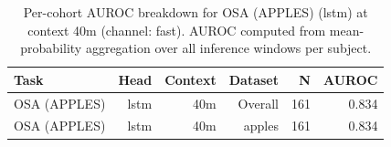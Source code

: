 \begin{table}[ht]
\centering
\caption{Per-cohort AUROC breakdown for OSA (APPLES) (lstm) at context 40m (channel: fast). AUROC computed from mean-probability aggregation over all inference windows per subject.}
\label{tab:cohort_osa_binary_apples_postqc_lstm_fast}
\begin{tabular}{lrrrrr}
\toprule
Task & Head & Context & Dataset & N & AUROC \\
\midrule
OSA (APPLES) & lstm & 40m & Overall & 161 & 0.834 \\
OSA (APPLES) & lstm & 40m & apples & 161 & 0.834 \\
\bottomrule
\end{tabular}
\end{table}